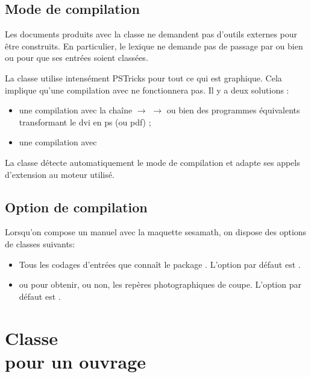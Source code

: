 \documentclass[nocrop]{sesamanuel}
\begin{document}
\section{Mode de compilation}
\label{sec-mode-de-compilation}
Les documents produits avec la classe ne demandent pas d'outils
externes pour être construits. En particulier, le lexique ne demande
pas de passage par  ou bien  ou
 pour que ses entrées soient classées.

\begin{remarque}
La classe utilise intensément PSTricks pour tout ce qui est
graphique. Cela implique qu'une compilation avec  ne
fonctionnera pas. Il y a deux solutions :
\begin{itemize}
\item une compilation avec la chaîne  $\to$ 
  $\to$  ou bien des programmes équivalents transformant
  le dvi en ps (ou pdf) ;
\item une compilation avec 
\end{itemize}
La classe détecte automatiquement le mode de compilation et adapte ses
appels d'extension au moteur utilisé.
\end{remarque}

\section{Option de compilation}
\label{sec-option-de-compilation}
Lorsqu'on compose un manuel avec la maquette sesamath, on dispose des
options de classes suivants:
\begingroup
{}
\begin{itemize}
\item Tous les codages d'entrées que connaît le package
  . L'option par défaut est .
\item {} ou  pour obtenir, ou non, les
  repères photographiques de coupe. L'option par défaut est
  .
\end{itemize}
\endgroup

\chapter{Classe\\ pour un ouvrage}\label{chClsPourOuvrage}
\end{document}
